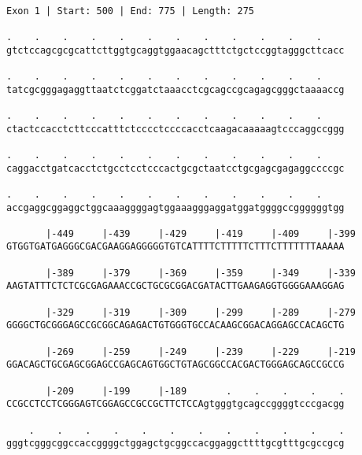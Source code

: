 \documentclass{article}
\begin{document}
 \begin{Verbatim}
 
Exon 1 | Start: 500 | End: 775 | Length: 275
 
.    .    .    .    .    .    .    .    .    .    .    .    
gtctccagcgcgcattcttggtgcaggtggaacagctttctgctccggtagggcttcacc
                                                            
.    .    .    .    .    .    .    .    .    .    .    .    
tatcgcgggagaggttaatctcggatctaaacctcgcagccgcagagcgggctaaaaccg
                                                            
.    .    .    .    .    .    .    .    .    .    .    .    
ctactccacctcttcccatttctcccctccccacctcaagacaaaaagtcccaggccggg
                                                            
.    .    .    .    .    .    .    .    .    .    .    .    
caggacctgatcacctctgcctcctcccactgcgctaatcctgcgagcgagaggccccgc
                                                            
.    .    .    .    .    .    .    .    .    .    .    .    
accgaggcggaggctggcaaaggggagtggaaagggaggatggatggggccggggggtgg
                                                            
       |-449     |-439     |-429     |-419     |-409     |-399
GTGGTGATGAGGGCGACGAAGGAGGGGGTGTCATTTTCTTTTTCTTTCTTTTTTTAAAAA
                                                            
       |-389     |-379     |-369     |-359     |-349     |-339
AAGTATTTCTCTCGCGAGAAACCGCTGCGCGGACGATACTTGAAGAGGTGGGGAAAGGAG
                                                            
       |-329     |-319     |-309     |-299     |-289     |-279
GGGGCTGCGGGAGCCGCGGCAGAGACTGTGGGTGCCACAAGCGGACAGGAGCCACAGCTG
                                                            
       |-269     |-259     |-249     |-239     |-229     |-219
GGACAGCTGCGAGCGGAGCCGAGCAGTGGCTGTAGCGGCCACGACTGGGAGCAGCCGCCG
                                                            
       |-209     |-199     |-189       .    .    .    .    .
CCGCCTCCTCGGGAGTCGGAGCCGCCGCTTCTCCAgtgggtgcagccggggtcccgacgg
                                                            
    .    .    .    .    .    .    .    .    .    .    .    .
gggtcgggcggccaccggggctggagctgcggccacggaggcttttgcgtttgcgccgcg
                                                            

\end{Verbatim}
\end{document}
